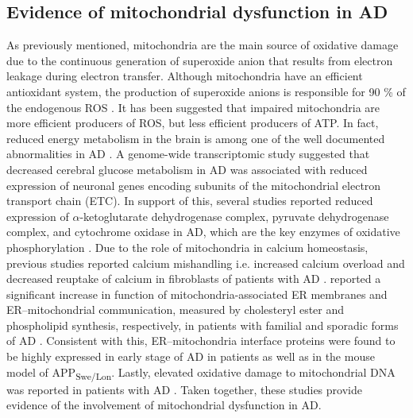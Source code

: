 \subsection{Evidence of mitochondrial dysfunction in AD}
As previously mentioned, mitochondria are the main source of oxidative damage due to the continuous generation of superoxide anion that results from electron leakage during electron transfer. Although mitochondria have an efficient antioxidant system, the production of superoxide anions is responsible for 90 \% of the endogenous ROS \citep{Wang2014}. It has been suggested that impaired mitochondria are more efficient producers of ROS, but less efficient producers of ATP. In fact, reduced energy metabolism in the brain is among one of the well documented abnormalities in AD \citep{Wang2014}. A genome-wide transcriptomic study suggested that decreased cerebral glucose metabolism in AD was associated with reduced expression of neuronal genes encoding subunits of the mitochondrial electron transport chain (ETC). In support of this, several studies reported reduced expression of $\alpha$-ketoglutarate dehydrogenase complex, pyruvate dehydrogenase complex, and cytochrome oxidase in AD, which are the key enzymes of oxidative phosphorylation \citep{Chandrasekaran1994,Cottrell2001,Maurer2000}. Due to the role of mitochondria in calcium homeostasis, previous studies reported calcium mishandling i.e. increased calcium overload and decreased reuptake of calcium in fibroblasts of patients with AD \citep{Ito1994,Peterson1985}. \citet{Area-Gomez2012} reported a significant increase in function of mitochondria-associated ER membranes and ER–mitochondrial communication, measured by cholesteryl ester and phospholipid synthesis, respectively, in patients with familial and sporadic forms of AD \citep{Area-Gomez2012}. Consistent with this, ER–mitochondria interface proteins were found to be highly expressed in early stage of AD in patients as well as in the mouse model of APP\textsubscript{Swe/Lon}. Lastly, elevated oxidative damage to mitochondrial DNA was reported in patients with AD \citep{Mecocci1994,Wang2005}. Taken together, these studies provide evidence of the involvement of mitochondrial dysfunction in AD.

